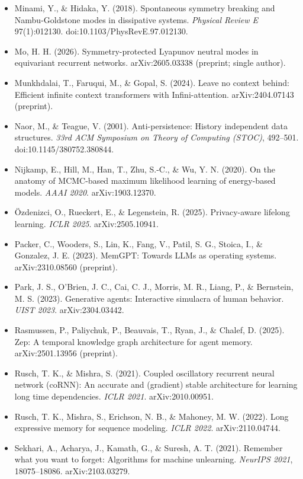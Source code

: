 \documentclass{article}
\begin{document}
\begin{itemize}
\item Minami, Y., \& Hidaka, Y. (2018). Spontaneous symmetry breaking and Nambu-Goldstone modes in dissipative systems. \emph{Physical Review E} 97(1):012130. doi:10.1103/PhysRevE.97.012130.
\item Mo, H. H. (2026). Symmetry-protected Lyapunov neutral modes in equivariant recurrent networks. arXiv:2605.03338 (preprint; single author).
\item Munkhdalai, T., Faruqui, M., \& Gopal, S. (2024). Leave no context behind: Efficient infinite context transformers with Infini-attention. arXiv:2404.07143 (preprint).
\item Naor, M., \& Teague, V. (2001). Anti-persistence: History independent data structures. \emph{33rd ACM Symposium on Theory of Computing (STOC)}, 492--501. doi:10.1145/380752.380844.
\item Nijkamp, E., Hill, M., Han, T., Zhu, S.-C., \& Wu, Y. N. (2020). On the anatomy of MCMC-based maximum likelihood learning of energy-based models. \emph{AAAI 2020}. arXiv:1903.12370.
\item \"Ozdenizci, O., Rueckert, E., \& Legenstein, R. (2025). Privacy-aware lifelong learning. \emph{ICLR 2025}. arXiv:2505.10941.
\item Packer, C., Wooders, S., Lin, K., Fang, V., Patil, S. G., Stoica, I., \& Gonzalez, J. E. (2023). MemGPT: Towards LLMs as operating systems. arXiv:2310.08560 (preprint).
\item Park, J. S., O'Brien, J. C., Cai, C. J., Morris, M. R., Liang, P., \& Bernstein, M. S. (2023). Generative agents: Interactive simulacra of human behavior. \emph{UIST 2023}. arXiv:2304.03442.
\item Rasmussen, P., Paliychuk, P., Beauvais, T., Ryan, J., \& Chalef, D. (2025). Zep: A temporal knowledge graph architecture for agent memory. arXiv:2501.13956 (preprint).
\item Rusch, T. K., \& Mishra, S. (2021). Coupled oscillatory recurrent neural network (coRNN): An accurate and (gradient) stable architecture for learning long time dependencies. \emph{ICLR 2021}. arXiv:2010.00951.
\item Rusch, T. K., Mishra, S., Erichson, N. B., \& Mahoney, M. W. (2022). Long expressive memory for sequence modeling. \emph{ICLR 2022}. arXiv:2110.04744.
\item Sekhari, A., Acharya, J., Kamath, G., \& Suresh, A. T. (2021). Remember what you want to forget: Algorithms for machine unlearning. \emph{NeurIPS 2021}, 18075--18086. arXiv:2103.03279.

\end{itemize}
\end{document}
